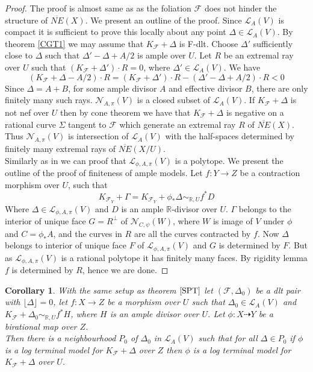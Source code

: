 \documentclass[12pt]{amsart}%
\theoremstyle{plain}
\newtheorem{corollary}[theorem]{Corollary}
\theoremstyle{remark}
\theoremstyle{definition}
\newcommand{\<}{\leq}
\newcommand{\mbR}{\mathbb{R}}
\theoremstyle{definition}
\theoremstyle{definition}
\numberwithin{equation}{section}
\theoremstyle{remark}
\begin{document}
\begin{proof}
 The proof is almost same as \cite[Theoem $3.11.1$ and Corollary $3.11.2$]{BCHM} as the foliation $\mathcal{F}$ does not hinder the structure of $\overline{NE}(X)$. We present an outline of the proof. Since $\mathcal{L}_{A}(V)$ is compact it is sufficient to prove this locally about any point $\Delta\in \mathcal{L}_A(V)$. By theorem \ref{CGT1} we may assume that $K_{\mathcal{F}}+\Delta$ is F-dlt. Choose $\Delta'$ sufficiently close to $\Delta$ such that $\Delta'-\Delta+A/2$ is ample over $U$. Let $R$ be an extremal ray over $U$ such that $(K_{\mathcal{F}}+\Delta')\cdot R=0$, where $\Delta'\in \mathcal{L}_A(V)$. We have\[
 (K_{\mathcal{F}}+\Delta-A/2)\cdot R=(K_{\mathcal{F}}+\Delta')\cdot R-(\Delta'-\Delta+A/2)\cdot R<0
 \]
Since $\Delta=A+B$, for some ample divisor $A$ and effective divisor $B$, there are only finitely many such rays. $\mathcal{N}_{A,\pi}(V)$ is a closed subset of $\mathcal{L}_A(V)$. If $K_{\mathcal{F}}+\Delta$ is not nef over $U$ then by cone theorem we have that $K_{\mathcal{F}}+\Delta$ is negative on a rational curve $\Sigma$ tangent to $\mathcal{F}$ which generate an extremal ray $R$ of $\overline{NE}(X)$. Thus $\mathcal{N}_{A,\pi}(V)$ is intersection of $\mathcal{L}_A(V)$ with the half-spaces determined by finitely many extremal rays of $\overline{NE}(X/U)$.\\
Similarly as in \cite[Corollary $3.11.2$]{BCHM} we can proof that $\mathcal{L}_{\phi,A,\pi}(V)$ is a polytope. We present the outline of the proof of finiteness of ample models. Let $f:Y\rightarrow Z$ be a contraction morphism over $U$, such that \[
K_{\mathcal{F}_Y}+\Gamma=K_{\mathcal{F}_Y}+\phi_*\Delta\sim_{\mbR,U}f^*D
\]
Where $\Delta\in \mathcal{L}_{\phi,A,\pi}(V)$ and $D$ is an ample $\mbR$-divisor over $U$. $\Gamma$ belongs to the interior of unique face $G=R^{\bot}$ of $\mathcal{N}_{C,\psi}(W)$, where $W$ is image of $V$ under $\phi$ and $C=\phi_*A$, and the curves in $R$ are all the curves contracted by $f$. Now $\Delta$ belongs to interior of unique face $F$ of $\mathcal{L}_{\phi,A,\pi}(V)$ and $G$ is determined by $F$. But as $\mathcal{L}_{\phi,A,\pi}(V)$ is a rational polytope it has finitely many faces. By rigidity lemma $f$ is determined by $R$, hence we are done.
\end{proof}
\begin{corollary}\label{SPT2}
    With the same setup as theorem $\ref{SPT}$ let $(\mathcal{F},\Delta_0)$ be a dlt pair with $\lfloor \Delta\rfloor=0$, let $f:X\rightarrow Z$ be a morphism over $U$ such that $\Delta_0\in \mathcal{L}_A(V)$ and $K_{\mathcal{F}}+\Delta_0\sim_{\mbR,U}f^* H$, where $H$ is an ample divisor over $U$. Let $\phi:X\dashrightarrow Y$ be a birational map over $Z$.\\
    Then there is a neighbourhood $P_0$ of $\Delta_0$ in $\mathcal{L}_A(V)$ such that for all $\Delta\in P_0$ if $\phi$ is a log terminal model for $K_{\mathcal{F}}+\Delta$ over $Z$ then $\phi$ is a log terminal model for $K_{\mathcal{F}}+\Delta$ over $U$.
\end{corollary}
\end{document}
